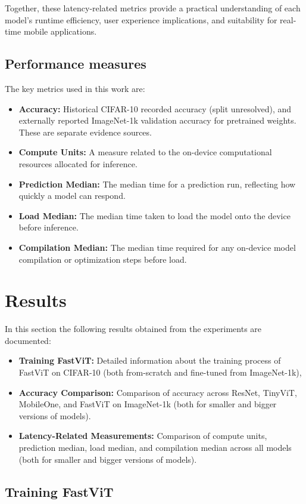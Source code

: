 \documentclass[12pt]{article}
\begin{document}
Together, these latency-related metrics provide a practical understanding of each model’s runtime efficiency, user experience implications, and suitability for real-time mobile applications.

\subsection{Performance measures}
The key metrics used in this work are:
\begin{itemize}
    \item \textbf{Accuracy:} Historical CIFAR-10 recorded accuracy (split unresolved), and externally reported ImageNet-1k validation accuracy for pretrained weights. These are separate evidence sources.
    \item \textbf{Compute Units:} A measure related to the on-device computational resources allocated for inference.
    \item \textbf{Prediction Median:} The median time for a prediction run, reflecting how quickly a model can respond.
    \item \textbf{Load Median:} The median time taken to load the model onto the device before inference.
    \item \textbf{Compilation Median:} The median time required for any on-device model compilation or optimization steps before load.
\end{itemize}

\section{Results}
In this section the following results obtained from the experiments are documented:
\begin{itemize}
    \item \textbf{Training FastViT:} Detailed information about the training process of FastViT on CIFAR-10 (both from-scratch and fine-tuned from ImageNet-1k),
    \item \textbf{Accuracy Comparison:} Comparison of accuracy across ResNet, TinyViT, MobileOne, and FastViT on ImageNet-1k (both for smaller and bigger versions of models).
    \item \textbf{Latency-Related Measurements:} Comparison of compute units, prediction median, load median, and compilation median across all models (both for smaller and bigger versions of models).
\end{itemize}

\subsection{Training FastViT}
\end{document}
